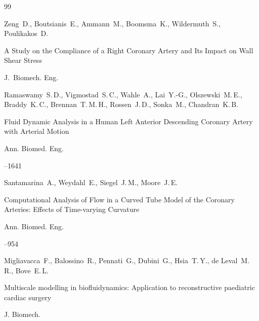 \begin{thebibliography}{99}







\by Zeng~D., Boutsianis~E., Ammann~M., Boomsma~K., Wildermuth~S., Poulikakos~D.

\paper A Study on the Compliance of a Right Coronary Artery and Its Impact on Wall Shear Stress

\jour J.~Biomech. Eng. 









\by Ramaswamy~S.\,D., Vigmostad~S.\,C., Wahle~A., Lai~Y.-G., Olszewski~M.\,E., Braddy~K.\,C., Brennan~T.\,M.\,H., Rossen~J.\,D.,  Sonka~M., Chandran~K.\,B.

\paper Fluid Dynamic Analysis in a Human Left Anterior Descending Coronary Artery with Arterial Motion 

\jour Ann. Biomed. Eng. 



--1641





\by Santamarina~A., Weydahl~E.,  Siegel~J.\,M., Moore~J.\,E.

\paper  Computational Analysis of Flow in a Curved Tube Model of the Coronary Arteries: Effects of Time-varying Curvature 

\jour Ann. Biomed. Eng. 



--954





\by Migliavacca~F., Balossino~R., Pennati~G., Dubini~G., Hsia~T.\,Y., de Leval~M.\,R., Bove~E.\,L.

\paper Multiscale modelling in biofluidynamics: Application to reconstructive paediatric cardiac surgery

\jour J. Biomech.


\end{thebibliography}
